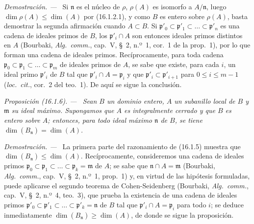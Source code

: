 \documentclass[10pt,oneside]{book}
\makeatletter
\newcommand{\setmanualcurrentlabel}[1]{\def\@currentlabel{#1}}
\newcommand{\oldpage}[2][]{%
  \setcounter{footnote}{0}%
  \marginpar{\scriptsize\textbf{#1}~|~#2}\ignorespaces}
\newenvironment{proposition}[1][]{%
  \setmanualcurrentlabel{#1}\par\medskip\noindent\itshape Proposición (#1). ---\ }{\par}
\newenvironment{proof}{%
  \par\medskip\noindent\textit{Demostración. ---\ }}{\par}
\providecommand{\setmin}{-}%
\makeatother
\begin{document}
\begin{proof}
\oldpage[0\textsubscript{IV-1}]{24}
Si $\mathfrak{n}$ es el núcleo de $\rho$, $\rho(A)$ es isomorfo a
$A/\mathfrak{n}$, luego $\dim\rho(A)\leq\dim(A)$ por (16.1.2.1), y como $B$
es entero sobre $\rho(A)$, basta demostrar la segunda afirmación cuando
$A\subset B$. Si
$\mathfrak{p}'_0\subset\mathfrak{p}'_1\subset\ldots\subset\mathfrak{p}'_n$
es una cadena de ideales primos de $B$, los $\mathfrak{p}'_i\cap A$ son
entonces ideales primos distintos en $A$ (Bourbaki, \emph{Alg.~comm.}, cap.~V,
\S~2, n.º~1, cor.~1 de la prop.~1), por lo que forman una cadena de ideales
primos. Recíprocamente, para toda cadena
$\mathfrak{p}_0\subset\mathfrak{p}_1\subset\ldots\subset\mathfrak{p}_m$
de ideales primos de $A$, se sabe que existe, para cada $i$, un ideal primo
$\mathfrak{p}'_i$ de $B$ tal que $\mathfrak{p}'_i\cap A=\mathfrak{p}_i$ y que
$\mathfrak{p}'_i\subset\mathfrak{p}'_{i+1}$ para $0\leq i\leq m\setmin 1$
(\emph{loc.~cit.}, cor.~2 del teo.~1). De aquí se sigue la conclusión.
\end{proof}

\begin{proposition}[16.1.6]
\label{0.16.1.6-es}
Sean $B$ un dominio entero, $A$ un subanillo local de $B$ y $\mathfrak{m}$ su
ideal máximo. Supongamos que $A$ es integralmente cerrado y que $B$ es entero
sobre $A$; entonces, para todo ideal máximo $\mathfrak{n}$ de $B$, se tiene
$\dim(B_{\mathfrak{n}})=\dim(A)$.
\end{proposition}

\begin{proof}
La primera parte del razonamiento de (16.1.5) muestra que
$\dim(B_{\mathfrak{n}})\leq\dim(A)$. Recíprocamente, consideremos una cadena
de ideales primos
$\mathfrak{p}_0\subset\mathfrak{p}_1\subset\ldots\subset
\mathfrak{p}_k=\mathfrak{m}$ de $A$; se sabe que
$\mathfrak{n}\cap A=\mathfrak{m}$ (Bourbaki, \emph{Alg.~comm.}, cap.~V,
\S~2, n.º~1, prop.~1) y, en virtud de las hipótesis formuladas, puede aplicarse
el segundo teorema de Cohen-Seidenberg (Bourbaki, \emph{Alg.~comm.}, cap.~V,
\S~2, n.º~4, teo.~3), que prueba la existencia de una cadena de ideales primos
$\mathfrak{p}'_0\subset\mathfrak{p}'_1\subset\ldots\subset
\mathfrak{p}'_k=\mathfrak{n}$ de $B$ tal que
$\mathfrak{p}'_i\cap A=\mathfrak{p}_i$ para todo $i$; se deduce inmediatamente
$\dim(B_{\mathfrak{n}})\geq\dim(A)$, de donde se sigue la proposición.
\end{proof}
\end{document}
